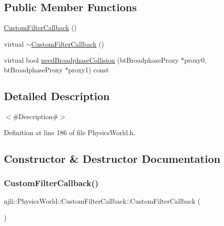 \subsection*{Public Member Functions}
\begin{DoxyCompactItemize}
\item 
\mbox{\hyperlink{classnjli_1_1_physics_world_1_1_custom_filter_callback_ad18b15dd9ba6a364c8a9dc05d84aebe4}{Custom\+Filter\+Callback}} ()
\item 
virtual \mbox{\hyperlink{classnjli_1_1_physics_world_1_1_custom_filter_callback_a293a3bfc1ea6a167ead405f4c30aa1a7}{$\sim$\+Custom\+Filter\+Callback}} ()
\item 
virtual bool \mbox{\hyperlink{classnjli_1_1_physics_world_1_1_custom_filter_callback_a4f3f385110e7c084da561ce32c61bffd}{need\+Broadphase\+Collision}} (bt\+Broadphase\+Proxy $\ast$proxy0, bt\+Broadphase\+Proxy $\ast$proxy1) const
\end{DoxyCompactItemize}


\subsection{Detailed Description}
$<$\#\+Description\#$>$ 

Definition at line 186 of file Physics\+World.\+h.



\subsection{Constructor \& Destructor Documentation}
\mbox{\label{classnjli_1_1_physics_world_1_1_custom_filter_callback_ad18b15dd9ba6a364c8a9dc05d84aebe4}} 
\subsubsection{\texorpdfstring{Custom\+Filter\+Callback()}{CustomFilterCallback()}}
{\footnotesize\ttfamily njli\+::\+Physics\+World\+::\+Custom\+Filter\+Callback\+::\+Custom\+Filter\+Callback (\begin{DoxyParamCaption}{ }\end{DoxyParamCaption})}


